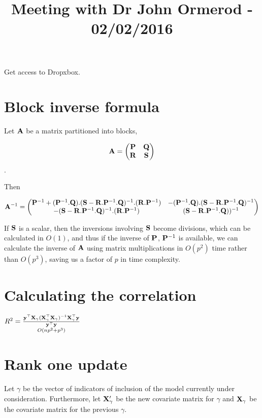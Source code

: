 \documentclass{amsart}
\title{Meeting with Dr John Ormerod - 02/02/2016}
\begin{document}
\maketitle

Get access to Dropxbox.

\section{Block inverse formula}
Let ${\bf A}$ be a matrix partitioned into blocks,

\begin{equation*}
{\bf A} = \begin{pmatrix}
{\bf P} & {\bf Q} \\
{\bf R} & {\bf S}
\end{pmatrix}
\end{equation*}.

Then

\begin{equation*}
{\bf A}^{-1} = \begin{pmatrix}
{\bf P}^{-1} + ({\bf P}^{-1}.{\bf Q}).({\bf S} - {\bf R}.{\bf P}^{-1}.{\bf Q})^{-1}.({\bf R}.{\bf P}^{-1}) & -({\bf P}^{-1}.{\bf Q}).({\bf S} - {\bf R}.{\bf P}^{-1}.{\bf Q})^{-1} \\
-({\bf S} - {\bf R}.{\bf P}^{-1}.{\bf Q})^{-1}.({\bf R}.{\bf P}^{-1}) & ({\bf S} - {\bf R}.{\bf P}{^{-1}.{\bf Q}}))^{-1}
\end{pmatrix}
\end{equation*}

If ${\bf S}$ is a scalar, then the inversions involving ${\bf S}$ become divisions, which can be calculated in $O(1)$,
and thus if the inverse of ${\bf P}$, ${\bf P}^{-1}$ is available, we can calculate the inverse of ${\bf A}$ using matrix
multiplications in $O(p^2)$ time rather than $O(p^3)$, saving us a factor of $p$ in time complexity.

\section{Calculating the correlation}
$R^2 = \underset{O(np^2 + p^3)}{\frac{{\bf y}^\top {\bf X}_\gamma ({\bf X}_\gamma^\top {\bf X}_\gamma)^{-1} {\bf X}_\gamma^\top {\bf y}}{{\bf y}^\top {\bf y}}}$


\section{Rank one update}

Let $\gamma$ be the vector of indicators of inclusion of the model currently under consideration. Furthermore,
let ${\bf X}'_\gamma$ be the new covariate matrix for $\gamma$ and ${\bf X}_\gamma$ be the covariate matrix for the
previous $\gamma$.
\end{document}
